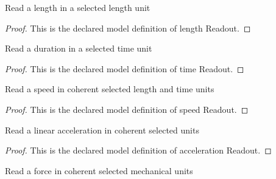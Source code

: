\begin{definition}
  \label{def:physics:phyx-mini-0771:phyxminiproblems-problemphyxmini0771-lengthreadout}
  Read a length in a selected length unit
\end{definition}
\begin{proof}
  This is the declared model definition of length Readout.
\end{proof}
\begin{definition}
  \label{def:physics:phyx-mini-0771:phyxminiproblems-problemphyxmini0771-timereadout}
  Read a duration in a selected time unit
\end{definition}
\begin{proof}
  This is the declared model definition of time Readout.
\end{proof}
\begin{definition}
  \label{def:physics:phyx-mini-0771:phyxminiproblems-problemphyxmini0771-speedreadout}
  Read a speed in coherent selected length and time units
\end{definition}
\begin{proof}
  This is the declared model definition of speed Readout.
\end{proof}
\begin{definition}
  \label{def:physics:phyx-mini-0771:phyxminiproblems-problemphyxmini0771-accelerationreadout}
  Read a linear acceleration in coherent selected units
\end{definition}
\begin{proof}
  This is the declared model definition of acceleration Readout.
\end{proof}
\begin{definition}
  \label{def:physics:phyx-mini-0771:phyxminiproblems-problemphyxmini0771-forcereadout}
  Read a force in coherent selected mechanical units
\end{definition}
